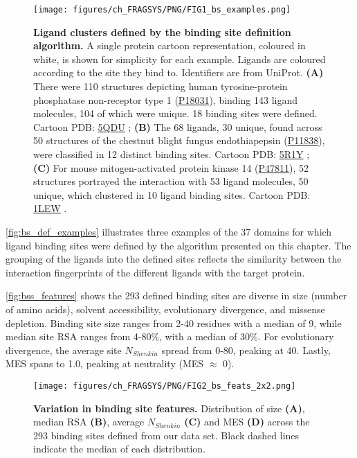 \begin{figure}[htb!]
    \centering
    \texttt{[image: figures/ch\_FRAGSYS/PNG/FIG1\_bs\_examples.png]}
    \caption[Ligand clusters defined by the binding site definition algorithm]{\textbf{Ligand clusters defined by the binding site definition algorithm.} A single protein cartoon representation, coloured in white, is shown for simplicity for each example. Ligands are coloured according to the site they bind to. Identifiers are from UniProt. \textbf{(A)} There were 110 structures depicting human tyrosine-protein phosphatase non-receptor type 1 (\href{https://www.uniprot.org/uniprotkb/P18031/entry}{P18031}), binding 143 ligand molecules, 104 of which were unique. 18 binding sites were defined. Cartoon PDB: \href{https://www.ebi.ac.uk/pdbe/entry/pdb/5qdu}{5QDU} \cite{KEEDY_2018_PTP1B}; \textbf{(B)} The 68 ligands, 30 unique, found across 50 structures of the chestnut blight fungus endothiapepsin (\href{https://www.uniprot.org/uniprotkb/P11838/entry}{P11838}), were classified in 12 distinct binding sites. Cartoon PDB: \href{https://www.ebi.ac.uk/pdbe/entry/pdb/5r1y}{5R1Y} \cite{WOLLENHAUPT_2020_F2X}; \textbf{(C)} For mouse mitogen-activated protein kinase 14 (\href{https://www.uniprot.org/uniprotkb/P47811/entry}{P47811}), 52 structures portrayed the interaction with 53 ligand molecules, 50 unique, which clustered in 10 ligand binding sites. Cartoon PDB: \href{https://www.ebi.ac.uk/pdbe/entry/pdb/1lew}{1LEW} \cite{CHANG_2002_MapKinase}.}
    \label{fig:bs_def_examples}
\end{figure}

\autoref{fig:bs_def_examples} illustrates three examples of the 37 domains for which ligand binding sites were defined by the algorithm presented on this chapter. The grouping of the ligands into the defined sites reflects the similarity between the interaction fingerprints of the different ligands with the target protein.

\autoref{fig:bss_features} shows the 293 defined binding sites are diverse in size (number of amino acids), solvent accessibility, evolutionary divergence, and missense depletion. Binding site size ranges from 2-40 residues with a median of 9, while median site RSA ranges from 4-80\%, with a median of 30\%. For evolutionary divergence, the average site $N_{Shenkin}$ spread from 0-80, peaking at 40. Lastly, MES spans  to 1.0, peaking at neutrality (MES $\approx$ 0).



\begin{figure}[htb!]
    \centering
    \texttt{[image: figures/ch\_FRAGSYS/PNG/FIG2\_bs\_feats\_2x2.png]}
    \caption[Variation in binding site features]{\textbf{Variation in binding site features.} Distribution of size \textbf{(A)}, median RSA \textbf{(B)}, average $N_{Shenkin}$ \textbf{(C)} and MES \textbf{(D)} across the 293 binding sites defined from our data set. Black dashed lines indicate the median of each distribution.}
    \label{fig:bss_features}
\end{figure}

